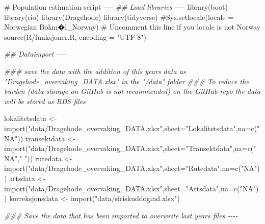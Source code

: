 \documentclass[
  letterpaper,
  DIV=11,
  numbers=noendperiod]{scrreport}
\newenvironment{Shaded}{\begin{snugshade}}{\end{snugshade}}
\newcommand{\AttributeTok}[1]{\textcolor[rgb]{0.40,0.45,0.13}{#1}}
\newcommand{\CommentTok}[1]{\textcolor[rgb]{0.37,0.37,0.37}{#1}}
\newcommand{\DocumentationTok}[1]{\textcolor[rgb]{0.37,0.37,0.37}{\textit{#1}}}
\newcommand{\FunctionTok}[1]{\textcolor[rgb]{0.28,0.35,0.67}{#1}}
\newcommand{\NormalTok}[1]{\textcolor[rgb]{0.00,0.23,0.31}{#1}}
\newcommand{\OtherTok}[1]{\textcolor[rgb]{0.00,0.23,0.31}{#1}}
\newcommand{\StringTok}[1]{\textcolor[rgb]{0.13,0.47,0.30}{#1}}
\begin{document}
\begin{Shaded}
\begin{Highlighting}[]
\CommentTok{\# Population estimation script {-}{-}{-}{-}}
\DocumentationTok{\#\# Load libraries {-}{-}{-}{-}}
\FunctionTok{library}\NormalTok{(boot)}
\FunctionTok{library}\NormalTok{(rio)}
\FunctionTok{library}\NormalTok{(Dragehode)}
\FunctionTok{library}\NormalTok{(tidyverse)}
\CommentTok{\#Sys.setlocale(locale = \textquotesingle{}Norwegian Bokm�l\_Norway\textquotesingle{}) }
\CommentTok{\# Uncomment this line if you locale is not Norway}
\FunctionTok{source}\NormalTok{(}\StringTok{\textquotesingle{}R/funksjoner.R\textquotesingle{}}\NormalTok{, }\AttributeTok{encoding =} \StringTok{"UTF{-}8"}\NormalTok{)}

\DocumentationTok{\#\# Dataimport {-}{-}{-}{-}}

\DocumentationTok{\#\#\# save the data with the addition of this years data as "Dragehode\_overvaking\_DATA.xlsx" in the "/data" folder}
\DocumentationTok{\#\#\# To reduce the burden (data storage on GitHub is not recommended) on the GitHub repo the data will be stored as RDS files}

\NormalTok{lokalitetsdata }\OtherTok{\textless{}{-}} \FunctionTok{import}\NormalTok{(}\StringTok{"data/Dragehode\_overvaking\_DATA.xlsx"}\NormalTok{,}\AttributeTok{sheet=}\StringTok{"Lokalitetsdata"}\NormalTok{,}\AttributeTok{na=}\FunctionTok{c}\NormalTok{(}\StringTok{"NA"}\NormalTok{))}
\NormalTok{transektdata }\OtherTok{\textless{}{-}} \FunctionTok{import}\NormalTok{(}\StringTok{"data/Dragehode\_overvaking\_DATA.xlsx"}\NormalTok{,}\AttributeTok{sheet=}\StringTok{"Transektdata"}\NormalTok{,}\AttributeTok{na=}\FunctionTok{c}\NormalTok{(}\StringTok{"NA"}\NormalTok{,}\StringTok{" "}\NormalTok{))}
\NormalTok{rutedata }\OtherTok{\textless{}{-}} \FunctionTok{import}\NormalTok{(}\StringTok{"data/Dragehode\_overvaking\_DATA.xlsx"}\NormalTok{,}\AttributeTok{sheet=}\StringTok{"Rutedata"}\NormalTok{,}\AttributeTok{na=}\FunctionTok{c}\NormalTok{(}\StringTok{"NA"}\NormalTok{))}
\NormalTok{artsdata }\OtherTok{\textless{}{-}} \FunctionTok{import}\NormalTok{(}\StringTok{"data/Dragehode\_overvaking\_DATA.xlsx"}\NormalTok{,}\AttributeTok{sheet=}\StringTok{"Artsdata"}\NormalTok{,}\AttributeTok{na=}\FunctionTok{c}\NormalTok{(}\StringTok{"NA"}\NormalTok{))}
\NormalTok{korreksjonsdata }\OtherTok{\textless{}{-}} \FunctionTok{import}\NormalTok{(}\StringTok{"data/siriskuddogind.xlsx"}\NormalTok{)}

\DocumentationTok{\#\#\# Save the data that has been imported to overwrite last years files {-}{-}{-}{-}}


\end{Highlighting}
\end{Shaded}
\end{document}
